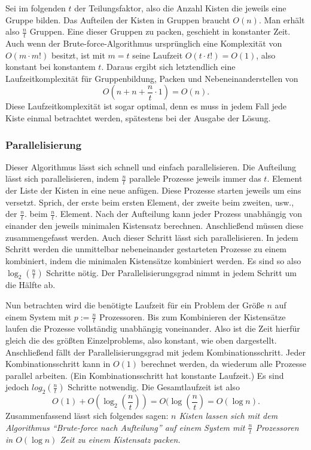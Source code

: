  Sei im folgenden $t$ der Teilungsfaktor, also die Anzahl Kisten die jeweils eine Gruppe bilden.
 Das Aufteilen der Kisten in Gruppen braucht $O(n)$. Man erhält also $\frac{n}{t}$ Gruppen.
 Eine dieser Gruppen zu packen, geschieht in konstanter Zeit. Auch wenn der Brute-force-Algorithmus ursprünglich eine Komplexität von $O(m \cdot m!)$ besitzt,
 ist mit $m=t$ seine Laufzeit $O(t \cdot t!) = O(1)$, also konstant bei konstantem $t$.
 Daraus ergibt sich letztendlich eine Laufzeitkomplexität für Gruppenbildung, Packen und Nebeneinanderstellen von
  \[ O(n + n + \frac{n}{t} \cdot 1) = O(n). \]
 Diese Laufzeitkomplexität ist sogar optimal, denn es muss in jedem Fall jede Kiste einmal betrachtet werden, spätestens bei der Ausgabe der Lösung.
\subsubsection{Parallelisierung}
 Dieser Algorithmus lässt sich schnell und einfach parallelisieren.
 Die Aufteilung lässt sich parallelisieren, indem $\frac{n}{t}$ parallele Prozesse jeweils immer das $t.$ Element der Liste der Kisten in eine neue anfügen.
 Diese Prozesse starten jeweils um eins versetzt.
 Sprich, der erste beim ersten Element, der zweite beim zweiten, usw., der $\frac{n}{t}.$ beim $\frac{n}{t}.$ Element.
 Nach der Aufteilung kann jeder Prozess unabhängig von einander den jeweils minimalen Kistensatz berechnen.
 Anschließend müssen diese zusammengefasst werden. Auch dieser Schritt lässt sich parallelisieren.
 In jedem Schritt werden die unmittelbar nebeneinander gestarteten Prozesse zu einem kombiniert, indem die minimalen Kistensätze kombiniert werden.
 Es sind so also $\log_2(\frac{n}{t})$ Schritte nötig. Der Parallelisierungsgrad nimmt in jedem Schritt um die Hälfte ab.

 Nun betrachten wird die benötigte Laufzeit für ein Problem der Größe $n$ auf einem System mit $p := \frac{n}{t}$ Prozessoren.
 Bis zum Kombinieren der Kistensätze laufen die Prozesse vollständig unabhängig voneinander.
 Also ist die Zeit hierfür gleich die des größten Einzelproblems, also konstant, wie oben dargestellt.
 Anschließend fällt der Parallelisierungsgrad mit jedem Kombinationsschritt.
 Jeder Kombinationsschritt kann in $O(1)$ berechnet werden, da wiederum alle Prozesse parallel arbeiten.
 (Ein Kombinationsschritt hat konstante Laufzeit.)
 Es sind jedoch $log_2(\frac{n}{t})$ Schritte notwendig.
 Die Gesamtlaufzeit ist also \[O(1)+O(\log_2(\frac{n}{t}))=O(\log(\frac{n}{t})=O(\log n).\]
 Zusammenfassend lässt sich folgendes sagen:
 \emph{$n$ Kisten lassen sich mit dem Algorithmus ``Brute-force nach Aufteilung'' auf einem System mit $\frac{n}{t}$ Prozessoren in $O(\log n)$ Zeit zu einem Kistensatz packen.}


